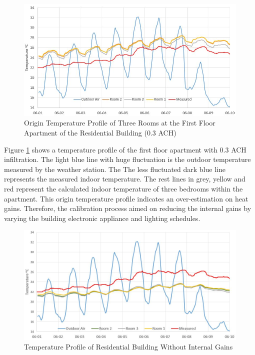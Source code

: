 \documentclass[a4paper, oneside]{discothesis}
\begin{document}
			\begin{figure}[H]
			\centering
			\includegraphics[scale=0.7]{figures/Hongg_Clibration_Origin.JPG}
			\caption{Origin Temperature Profile of Three Rooms at the First Floor Apartment of the Residential Building (0.3 ACH)}
			\label{fig:HonggCalibrationOrigin}
			\end{figure}
			
			Figure \ref{fig:HonggCalibrationOrigin} shows a temperature profile of the first floor apartment with 0.3 ACH infiltration. The light blue line with huge fluctuation is the outdoor temperature measured by the weather station. The The less fluctuated dark blue line represents the measured indoor temperature. The rest lines in grey, yellow and red represent the calculated indoor temperature of three bedrooms within the apartment. This origin temperature profile indicates an over-estimation on heat gains. Therefore, the calibration process aimed on reducing the internal gains by varying the building electronic appliance and lighting schedules.\\
			
			\begin{figure}[H]
			\centering
			\includegraphics[scale=0.57]{figures/Hongg_Cali_NoFacility.JPG}
			\caption{Temperature Profile of Residential Building Without Internal Gains}
			\label{fig:HonggCalibrationNoGains}
			\end{figure}
			
\end{document}
